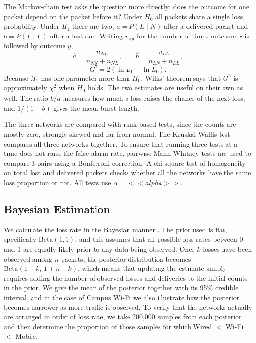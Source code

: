 \documentclass[conference]{IEEEtran}
\begin{document}
The Markov-chain test asks the question more directly: does the outcome for one packet depend on the packet before it? Under $H_0$ all packets share a single loss probability. Under $H_1$ there are two, $a=P(L\mid N)$ after a delivered packet and $b=P(L\mid L)$ after a lost one. Writing $n_{xy}$ for the number of times outcome $x$ is followed by outcome $y$,
\begin{equation}
\hat a=\frac{n_{NL}}{n_{NN}+n_{NL}},\qquad \hat b=\frac{n_{LL}}{n_{LN}+n_{LL}},
\end{equation}
\begin{equation}
G^2=2(\ln L_1-\ln L_0).
\end{equation}
Because $H_1$ has one parameter more than $H_0$, Wilks' theorem \cite{wilks1938} says that $G^2$ is approximately $\chi^2_1$ when $H_0$ holds. The two estimates are useful on their own as well. The ratio $b/a$ measures how much a loss raises the chance of the next loss, and $1/(1-b)$ gives the mean burst length.

The three networks are compared with rank-based tests, since the counts are mostly zero, strongly skewed and far from normal. The Kruskal-Wallis test \cite{kruskal1952} compares all three networks together. To ensure that running three tests at a time does not raise the false-alarm rate, pairwise Mann-Whitney tests \cite{mann1947} are used to compare 3 pairs using a Bonferroni correction. A chi-square test of homogeneity on total lost and delivered packets checks whether all the networks have the same loss proportion or not. All tests use $\alpha=<<alpha>>$.

\subsection{Bayesian Estimation}
We calculate the loss rate in the Bayesian manner \cite{gelman2013}. The prior used is flat, specifically $\text{Beta}(1,1)$, and this assumes that all possible loss rates between 0 and 1 are equally likely prior to any data being observed. Once $k$ losses have been observed among $n$ packets, the posterior distribution becomes $\text{Beta}(1+k,\,1+n-k)$, which means that updating the estimate simply requires adding the number of observed losses and deliveries to the initial counts in the prior. We give the mean of the posterior together with its 95\% credible interval, and in the case of Campus Wi-Fi we also illustrate how the posterior becomes narrower as more traffic is observed. To verify that the networks actually are arranged in order of loss rate, we take 200,000 samples from each posterior and then determine the proportion of those samples for which Wired $<$ Wi-Fi $<$ Mobile.
\end{document}
